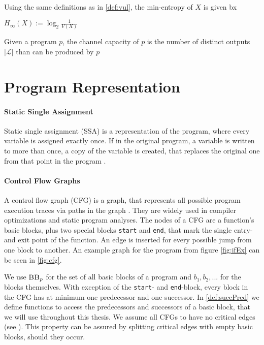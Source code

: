 \begin{definition}
    Using the same definitions as in \ref{def:vul}, the min-entropy of $X$ is given bx
    \begin{center}
        $H_\infty (X) := \log_2 \frac{1}{V(X)}$
    \end{center}
\end{definition}

\begin{definition}
    
    Given a program $p$, the channel capacity of $p$ is the number of distinct outputs $|\mathcal{L}|$ than can be produced by $p$
\end{definition}


\section{Program Representation}

\paragraph{Static Single Assignment}
Static single assignment (SSA) is a representation of the program, where every variable is assigned exactly once. If in the original program, a variable is written to more than once, a copy of the variable is created, that replaces the original one from that point in the program \cite{rosen88}.

\paragraph{Control Flow Graphs}
A control flow graph (CFG) is a graph, that represents all possible program execution traces via paths in the graph \cite{allen70}. They are widely used in compiler optimizations and static program analyses. The nodes of a CFG are a function's basic blocks, plus two special blocks \texttt{start} and \texttt{end}, that mark the single entry- and exit point of the function. An edge is inserted for every possible jump from one block to another. An example graph for the program from figure \ref{fig:ifEx} can be seen in \ref{fig:cfg}.

We use $\mbb_p$ for the set of all basic blocks of a program \p and $b_1, b_2, ...$ for the blocks themselves. With exception of the \texttt{start}- and \texttt{end}-block, every block in the CFG has at minimum one predecessor and one successor. In \ref{def:succPred} we define functions to access the predecessors and successors of a basic block, that we will use throughout this thesis. We assume all CFGs to have no critical edges (see \cite{dragoonBook}). This property can be assured by splitting critical edges with empty basic blocks, should they occur. 

